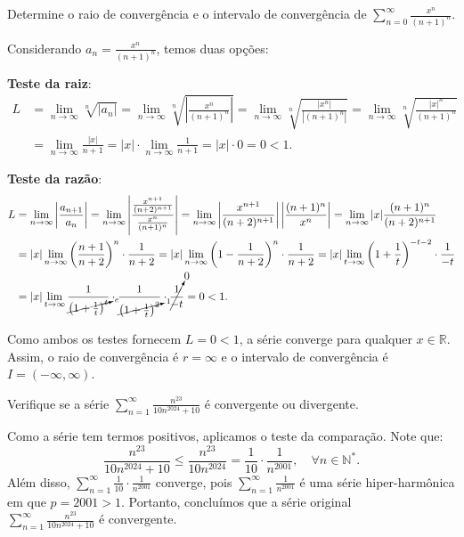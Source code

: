 \documentclass[12pt,a4paper]{article}
\begin{document}
\begin{ExerciseList}
\Exercise[title={2,5}] Determine o raio de convergência e o intervalo de convergência de \(\sum_{n=0}^{\infty} \frac{x^n}{(n+1)^n}\).

\Answer Considerando \( a_n = \frac{x^n}{(n+1)^n} \), temos duas opções:

\textbf{Teste da raiz}:
\begin{align*}
    L
    &
    = \lim_{n \to \infty} \sqrt[n]{\left| a_n \right|}
    = \lim_{n \to \infty} \sqrt[n]{\left| \frac{x^n}{(n+1)^n} \right|}
    = \lim_{n \to \infty} \sqrt[n]{\frac{|x^n|}{|(n+1)^n|}}
    = \lim_{n \to \infty} \sqrt[n]{\frac{|x|^n}{(n+1)^n}} \\
    &
    = \lim_{n \to \infty} \frac{|x|}{n+1}
    = |x| \cdot \lim_{n \to \infty} \frac{1}{n+1}
    = |x| \cdot 0
    = 0
    < 1.
\end{align*}

\textbf{Teste da razão}:
\begin{align*}
    L
    &
    = \lim_{n \to \infty} \left| \frac{a_{n+1}}{a_n} \right|
    = \lim_{n \to \infty} \left| \frac{\frac{x^{n+1}}{(n+2)^{n+1}}}{\frac{x^n}{(n+1)^n}} \right|
    = \lim_{n \to \infty} \left| \frac{x^{n+1}}{(n+2)^{n+1}}\right| \left|\frac{(n+1)^n}{x^n} \right|
    = \lim_{n \to \infty} |x| \frac{(n+1)^n}{(n+2)^{n+1}}\\
    &
    = |x| \lim_{n \to \infty} \left( \frac{n+1}{n+2}\right)^n \cdot\frac{1}{n+2}
    = |x| \lim_{n \to \infty} \left(1 - \frac{1}{n+2}\right)^n \cdot\frac{1}{n+2}
    = |x| \lim_{t \to \infty} \left(1 + \frac{1}{t}\right)^{-t-2} \cdot \frac{1}{-t} \\
    &
    = |x| \lim_{t \to \infty}
    \frac{1}{\cancelto{e}{\left(1 + \frac{1}{t}\right)^t}}
    \cdot \frac{1}{\cancelto{1}{\left(1 + \frac{1}{t}\right)^2}}
    \cdot \cancelto{0}{\frac{1}{-t}}
    = 0
    < 1.
\end{align*}

Como ambos os testes fornecem $L = 0 < 1$, a série converge para qualquer \( x \in \mathbb{R} \). Assim, o raio de convergência é \(\boxed{r = \infty}\) e o intervalo de convergência é \(\boxed{I = (-\infty, \infty)}\).

\Exercise[title={2,5}] Verifique se a série \(\sum_{n=1}^\infty \frac{n^{23}}{10n^{2024} + 10}\) é convergente ou divergente.

\Answer Como a série tem termos positivos, aplicamos o teste da comparação. Note que:
\[
\frac{n^{23}}{10n^{2024} + 10}
\leq \frac{n^{23}}{10n^{2024}}
= \frac{1}{10} \cdot \frac{1}{n^{2001}}, \quad \forall n \in \mathbb{N}^*.
\]
Além disso, \(\sum_{n=1}^{\infty} \frac{1}{10} \cdot \frac{1}{n^{2001}}\) converge, pois \(\sum_{n=1}^{\infty} \frac{1}{n^{2001}}\) é uma série hiper-harmônica em que \(p = 2001 > 1\).
Portanto, concluímos que a série original \(\boxed{\sum_{n=1}^{\infty} \frac{n^{23}}{10n^{2024} + 10} \text{ é convergente}}\).



\end{ExerciseList}
\end{document}
